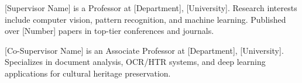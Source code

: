 \documentclass[journal]{IEEEtran}
\begin{document}
\begin{IEEEbiographynophoto}{[Supervisor Name]}
is a Professor at [Department], [University]. Research interests include computer vision, pattern recognition, and machine learning. Published over [Number] papers in top-tier conferences and journals.
\end{IEEEbiographynophoto}

\begin{IEEEbiographynophoto}{[Co-Supervisor Name]}
is an Associate Professor at [Department], [University]. Specializes in document analysis, OCR/HTR systems, and deep learning applications for cultural heritage preservation.
\end{IEEEbiographynophoto}
\end{document}
